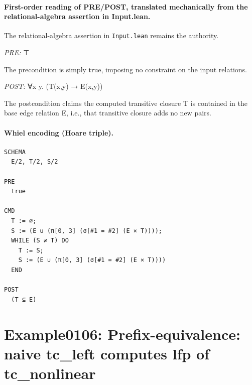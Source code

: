 \documentclass[10pt]{article}
\begin{document}
\paragraph{First-order reading of PRE/POST, translated mechanically from the relational-algebra assertion in Input.lean.} The relational-algebra assertion in \texttt{Input.lean} remains the authority.

\textit{PRE:} ⊤\par The precondition is simply true, imposing no constraint on the input relations.

\textit{POST:} ∀x y. (T(x,y) → E(x,y))\par The postcondition claims the computed transitive closure T is contained in the base edge relation E, i.e., that transitive closure adds no new pairs.

\paragraph{Whiel encoding (Hoare triple).}

\begin{Verbatim}[fontsize=\scriptsize,breaklines=true,breakanywhere=true,frame=single,framesep=1.5mm]
SCHEMA
  E/2, T/2, S/2

PRE
  true 

CMD
  T := ∅;
  S := (E ∪ (π[0, 3] (σ[#1 = #2] (E × T))));
  WHILE (S ≠ T) DO
    T := S;
    S := (E ∪ (π[0, 3] (σ[#1 = #2] (E × T))))
  END

POST
  (T ⊆ E)
\end{Verbatim}

\Needspace{0.45\textheight}

\section{Example0106: Prefix-equivalence: naive tc\_left computes lfp of tc\_nonlinear}\label{case:Example0106}
\end{document}
